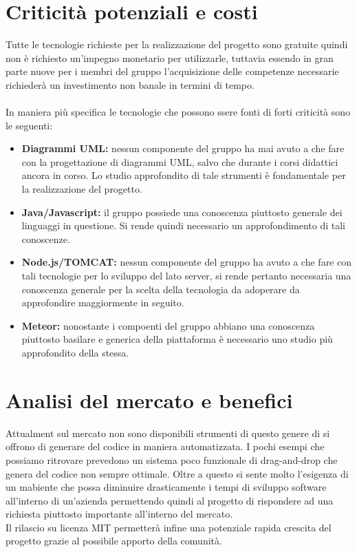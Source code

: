 \documentclass[a4paper]{report}
\begin{document}
      \section{Criticità potenziali e costi}
        Tutte le tecnologie richieste per la realizzazione del progetto sono gratuite quindi non è richiesto
        un'impegno monetario per utilizzarle, tuttavia essendo in gran parte nuove per i membri del gruppo
        l'acquisizione delle competenze necessarie richiederà un investimento non banale in termini di
        tempo.
        \\ \\
        In maniera più specifica le tecnologie che possono ssere fonti di forti criticità sono le seguenti:
          \begin{itemize}
            \item \textbf{Diagrammi UML:} nessun componente del gruppo ha mai avuto a che fare con la progettazione di diagrammi UML, salvo che durante i corsi didattici ancora
            in corso. Lo studio approfondito di tale strumenti è fondamentale per la realizzazione del progetto.
            \item \textbf{Java/Javascript:} il gruppo possiede una conoscenza piuttosto generale dei linguaggi in questione. Si rende quindi necessario un approfondimento di tali
            conoscenze.
            \item \textbf{Node.js/TOMCAT:} nessun componente del gruppo ha avuto a che fare con tali tecnologie per lo sviluppo del lato server, si rende pertanto necessaria una conoscenza
            generale per la scelta della tecnologia da adoperare da approfondire maggiormente in seguito.
            \item \textbf{Meteor:} nonostante i compoenti del gruppo abbiano una conoscenza piuttosto basilare e generica della piattaforma è necessario uno studio più approfondito della stessa.
          \end{itemize}
      \section{Analisi del mercato e benefici}
        Attualment sul mercato non sono disponibili strumenti di questo genere di si offrono di generare del codice in maniera automatizzata. I pochi esempi che possiamo ritrovare
        prevedono un sistema poco funzionale di drag-and-drop che genera del codice non sempre ottimale.
        Oltre a questo si sente molto l'esigenza di un mabiente che possa diminuire drasticamente i tempi di sviluppo software all'interno di un'azienda permettendo quindi al progetto
        di rispondere ad una richiesta piuttosto importante all'interno del mercato. \\
        Il rilascio su licenza MIT permetterà infine una potenziale rapida crescita del progetto grazie al possibile apporto della comunità.
\end{document}
